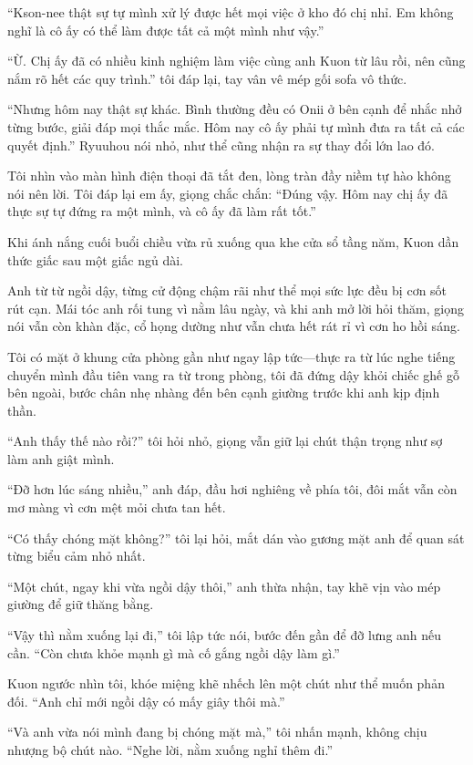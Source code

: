 \documentclass[../main.tex]{subfiles}
\begin{document}
``Kson-nee thật sự tự mình xử lý được hết mọi việc ở kho đó chị nhỉ. Em không nghĩ là cô ấy có thể làm được tất cả một mình như vậy.''

``Ừ. Chị ấy đã có nhiều kinh nghiệm làm việc cùng anh Kuon từ lâu rồi, nên cũng nắm rõ hết các quy trình.'' tôi đáp lại, tay vân vê mép gối sofa vô thức.

``Nhưng hôm nay thật sự khác. Bình thường đều có Onii ở bên cạnh để nhắc nhở từng bước, giải đáp mọi thắc mắc. Hôm nay cô ấy phải tự mình đưa ra tất cả các quyết định.'' Ryuuhou nói nhỏ, như thể cũng nhận ra sự thay đổi lớn lao đó.

Tôi nhìn vào màn hình điện thoại đã tắt đen, lòng tràn đầy niềm tự hào không nói nên lời. Tôi đáp lại em ấy, giọng chắc chắn: ``Đúng vậy. Hôm nay chị ấy đã thực sự tự đứng ra một mình, và cô ấy đã làm rất tốt.''

\ct

Khi ánh nắng cuối buổi chiều vừa rủ xuống qua khe cửa sổ tầng năm, Kuon dần thức giấc sau một giấc ngủ dài.

Anh từ từ ngồi dậy, từng cử động chậm rãi như thể mọi sức lực đều bị cơn sốt rút cạn. Mái tóc anh rối tung vì nằm lâu ngày, và khi anh mở lời hỏi thăm, giọng nói vẫn còn khàn đặc, cổ họng dường như vẫn chưa hết rát rỉ vì cơn ho hồi sáng.

Tôi có mặt ở khung cửa phòng gần như ngay lập tức—thực ra từ lúc nghe tiếng chuyển mình đầu tiên vang ra từ trong phòng, tôi đã đứng dậy khỏi chiếc ghế gỗ bên ngoài, bước chân nhẹ nhàng đến bên cạnh giường trước khi anh kịp định thần.

``Anh thấy thế nào rồi?'' tôi hỏi nhỏ, giọng vẫn giữ lại chút thận trọng như sợ làm anh giật mình.

``Đỡ hơn lúc sáng nhiều,'' anh đáp, đầu hơi nghiêng về phía tôi, đôi mắt vẫn còn mơ màng vì cơn mệt mỏi chưa tan hết.

``Có thấy chóng mặt không?'' tôi lại hỏi, mắt dán vào gương mặt anh để quan sát từng biểu cảm nhỏ nhất.

``Một chút, ngay khi vừa ngồi dậy thôi,'' anh thừa nhận, tay khẽ vịn vào mép giường để giữ thăng bằng.

``Vậy thì nằm xuống lại đi,'' tôi lập tức nói, bước đến gần để đỡ lưng anh nếu cần. ``Còn chưa khỏe mạnh gì mà cố gắng ngồi dậy làm gì.''

Kuon ngước nhìn tôi, khóe miệng khẽ nhếch lên một chút như thể muốn phản đối. ``Anh chỉ mới ngồi dậy có mấy giây thôi mà.''

``Và anh vừa nói mình đang bị chóng mặt mà,'' tôi nhấn mạnh, không chịu nhượng bộ chút nào. ``Nghe lời, nằm xuống nghỉ thêm đi.''
\end{document}
